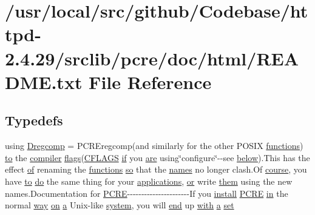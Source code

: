 \hypertarget{README_8txt}{}\section{/usr/local/src/github/\+Codebase/httpd-\/2.4.29/srclib/pcre/doc/html/\+R\+E\+A\+D\+ME.txt File Reference}
\label{README_8txt}
\subsection*{Typedefs}
\begin{DoxyCompactItemize}
\item 
using \hyperlink{README_8txt_ae7677822fff7f2fa74781785b5dd78e7}{Dregcomp} = P\+C\+R\+Eregcomp(and similarly for the other P\+O\+S\+IX \hyperlink{pcre_8txt_ab5e14e1ddfeb357534a3400e633014d1}{functions}) \hyperlink{pcretest_8txt_aa22c98f630e4b3fe86ee17ce5150c62f}{to} the \hyperlink{NON-AUTOTOOLS-BUILD_8txt_a64002cde265dd3dc6769b7718a559183}{compiler} \hyperlink{pcre_8txt_ad7a10cd81a384ff727296d05bb827806}{flags}(\hyperlink{NON-AUTOTOOLS-BUILD_8txt_a584debe9e4020eaffb9dd784c705c74a}{C\+F\+L\+A\+GS} \hyperlink{util__expr__scan_8c_aa1a71763978093648dffef60b56f7447}{if} you \hyperlink{pcre_8txt_a98da773651c0ef9992aa9a7bab588058}{are} using\char`\"{}configure\char`\"{}-\/-\/see \hyperlink{pcregrep_8txt_aaaf244ff4b792292ac1e3985d16c6d09}{below}).This has the effect \hyperlink{pcre_8txt_a9d5b55a535a7d176d14b62d664b47b4d}{of} renaming the \hyperlink{pcre_8txt_ab5e14e1ddfeb357534a3400e633014d1}{functions} \hyperlink{pcretest_8txt_a35e1c9bd1e24f3f31253ab761f792055}{so} that the \hyperlink{pcregrep_8txt_a0329fb20db61aae75d49812105cad192}{names} no longer clash.\+Of \hyperlink{pcre_8txt_a02e85ab8476f24744f093452479407f7}{course}, you have \hyperlink{pcretest_8txt_aa22c98f630e4b3fe86ee17ce5150c62f}{to} \hyperlink{pcregrep_8txt_a29df1716374a8e3439d34a27760970bd}{do} the same thing for your \hyperlink{pcre_8txt_a70c15d81956696bd254e6c4744940908}{applications}, \hyperlink{pcretest_8txt_a1e1dbf0220a28f9a8c394172dd6da171}{or} write \hyperlink{pcre_8txt_a0e8e2da7fbfcadad04dc71eddf8ccf26}{them} using the new names.\+Documentation for \hyperlink{pcre_8txt_a970782a5ef22596881e664deb789f171}{P\+C\+RE}-\/-\/-\/-\/-\/-\/-\/-\/-\/-\/-\/-\/-\/-\/-\/-\/-\/-\/-\/-\/-\/-\/If you \hyperlink{README_8txt_a675da2c1f8852c2eb679a0aca31aafef}{install} \hyperlink{pcre_8txt_a970782a5ef22596881e664deb789f171}{P\+C\+RE} \hyperlink{group__apr__thread__proc_ga2e46fea00cc2238744ebca5061c62bcc}{in} the normal \hyperlink{pcregrep_8txt_aa4e86b9ea8ebfedd4391c14cb64aa593}{way} \hyperlink{group__apr__thread__proc_gade8f959a935ed315f9f55422c7de9903}{on} \hyperlink{pcre_8txt_a841271aab70f5cda9412a19c7753f02c}{a} Unix-\/like \hyperlink{pcre_8txt_acd344400255173b94380e8f8cdfa5ddc}{system}, you will \hyperlink{group__apr__strings_ga87c7e3f3f70b6e7de10e3f56e3f4d7a4}{end} up \hyperlink{group__apr__atomic_ga62bdcea60b77e638d3d88947a34aff05}{with} \hyperlink{pcre_8txt_a841271aab70f5cda9412a19c7753f02c}{a} \hyperlink{README_8txt_af5b772536a61c888f9b40122c9816047}{set} 
\end{DoxyCompactItemize}

